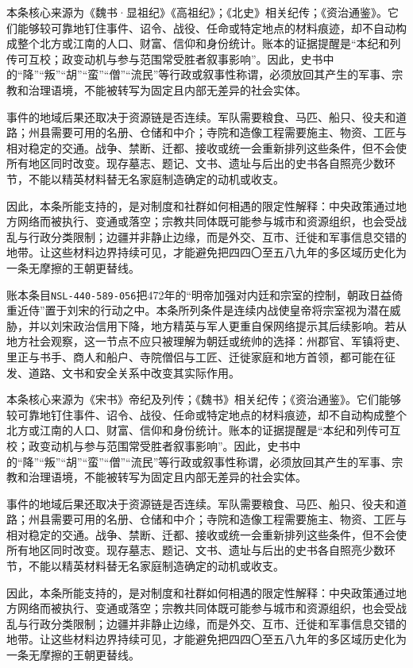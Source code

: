 本条核心来源为《魏书·显祖纪》《高祖纪》；《北史》相关纪传；《资治通鉴》。它们能够较可靠地钉住事件、诏令、战役、任命或特定地点的材料痕迹，却不自动构成整个北方或江南的人口、财富、信仰和身份统计。账本的证据提醒是“本纪和列传可互校；政变动机与参与范围常受胜者叙事影响”。因此，史书中的“降”“叛”“胡”“蛮”“僧”“流民”等行政或叙事性称谓，必须放回其产生的军事、宗教和治理语境，不能被转写为固定且内部无差异的社会实体。

事件的地域后果还取决于资源链是否连续。军队需要粮食、马匹、船只、役夫和道路；州县需要可用的名册、仓储和中介；寺院和造像工程需要施主、物资、工匠与相对稳定的交通。战争、禁断、迁都、接收或统一会重新排列这些条件，但不会使所有地区同时改变。现存墓志、题记、文书、遗址与后出的史书各自照亮少数环节，不能以精英材料替无名家庭制造确定的动机或收支。

因此，本条所能支持的，是对制度和社群如何相遇的限定性解释：中央政策通过地方网络而被执行、变通或落空；宗教共同体既可能参与城市和资源组织，也会受战乱与行政分类限制；边疆并非静止边缘，而是外交、互市、迁徙和军事信息交错的地带。让这些材料边界持续可见，才能避免把四四〇至五八九年的多区域历史化为一条无摩擦的王朝更替线。

账本条目\texttt{NSL-440-589-056}把472年的“明帝加强对内廷和宗室的控制，朝政日益倚重近侍”置于刘宋的行动之中。本条所列条件是连续内战使皇帝将宗室视为潜在威胁，并以刘宋政治信用下降，地方精英与军人更重自保网络提示其后续影响。若从地方社会观察，这一节点不应只被理解为朝廷或统帅的选择：州郡官、军镇将吏、里正与书手、商人和船户、寺院僧侣与工匠、迁徙家庭和地方首领，都可能在征发、道路、文书和安全关系中改变其实际作用。

本条核心来源为《宋书》帝纪及列传；《魏书》相关纪传；《资治通鉴》。它们能够较可靠地钉住事件、诏令、战役、任命或特定地点的材料痕迹，却不自动构成整个北方或江南的人口、财富、信仰和身份统计。账本的证据提醒是“本纪和列传可互校；政变动机与参与范围常受胜者叙事影响”。因此，史书中的“降”“叛”“胡”“蛮”“僧”“流民”等行政或叙事性称谓，必须放回其产生的军事、宗教和治理语境，不能被转写为固定且内部无差异的社会实体。

事件的地域后果还取决于资源链是否连续。军队需要粮食、马匹、船只、役夫和道路；州县需要可用的名册、仓储和中介；寺院和造像工程需要施主、物资、工匠与相对稳定的交通。战争、禁断、迁都、接收或统一会重新排列这些条件，但不会使所有地区同时改变。现存墓志、题记、文书、遗址与后出的史书各自照亮少数环节，不能以精英材料替无名家庭制造确定的动机或收支。

因此，本条所能支持的，是对制度和社群如何相遇的限定性解释：中央政策通过地方网络而被执行、变通或落空；宗教共同体既可能参与城市和资源组织，也会受战乱与行政分类限制；边疆并非静止边缘，而是外交、互市、迁徙和军事信息交错的地带。让这些材料边界持续可见，才能避免把四四〇至五八九年的多区域历史化为一条无摩擦的王朝更替线。


